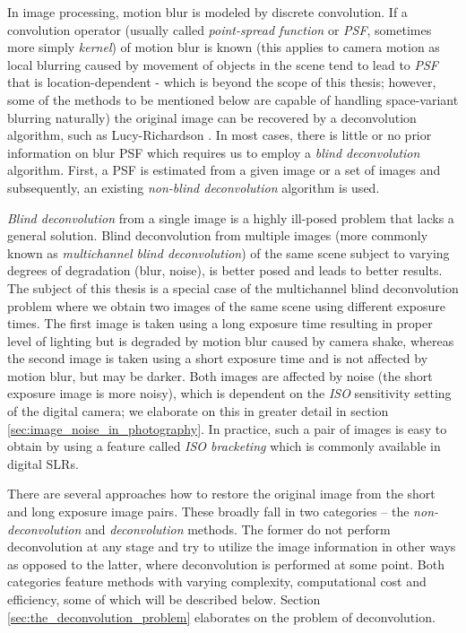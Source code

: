 \documentclass[12pt,notitlepage]{report}
\begin{document}
In image processing, motion blur is modeled by discrete convolution. If a convolution operator (usually called {\em point-spread function} or {\em PSF}, sometimes more simply {\em kernel}) of motion blur is known (this applies to camera motion as local blurring caused by movement of objects in the scene tend to lead to {\em PSF} that is location-dependent - which is beyond the scope of this thesis; however, some of the methods to be mentioned below are capable of handling space-variant blurring naturally) the original image can be recovered by a deconvolution algorithm, such as Lucy-Richardson \cite{rich72}. In most cases, there is little or no prior information on blur PSF which requires us to employ a {\em blind deconvolution} algorithm. First, a PSF is estimated from a given image or a set of images and subsequently, an existing {\em non-blind deconvolution} algorithm is used. 

{\em Blind deconvolution} from a single image is a highly ill-posed problem that lacks a general solution. Blind deconvolution from multiple images (more commonly known as {\em multichannel blind deconvolution}) of the same scene subject to varying degrees of degradation (blur, noise), is better posed and leads to better results. The subject of this thesis is a special case of the multichannel blind deconvolution problem where we obtain two images of the same scene using different exposure times. The first image is taken using a long exposure time resulting in proper level of lighting but is degraded by motion blur caused by camera shake, whereas the second image is taken using a short exposure time and is not affected by motion blur, but may be darker.  Both images are affected by noise (the short exposure image is more noisy), which is dependent on the {\em ISO} sensitivity setting of the digital camera; we elaborate on this in greater detail in section \ref{sec:image_noise_in_photography}. In practice, such a pair of images is easy to obtain by using a feature called {\em ISO bracketing} which is commonly available in digital SLRs.
 
There are several approaches how to restore the original image from the short and long exposure image pairs. These broadly fall in two categories – the {\em non-deconvolution} and {\em deconvolution} methods. The former do not perform deconvolution at any stage and try to utilize the image information in other ways as opposed to the latter, where deconvolution is performed at some point. Both categories feature methods with varying complexity, computational cost and efficiency, some of which will be described below. Section \ref{sec:the_deconvolution_problem} elaborates on the problem of deconvolution. 
\end{document}

